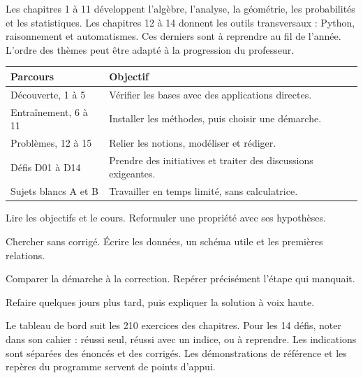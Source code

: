 \thispagestyle{otFront}
\fontsize{11}{15}\selectfont
{}
Les chapitres 1 à 11 développent l'algèbre, l'analyse, la géométrie, les probabilités
et les statistiques. Les chapitres 12 à 14 donnent les outils transversaux : Python,
raisonnement et automatismes. Ces derniers sont à reprendre au fil de l'année.
L'ordre des thèmes peut être adapté à la progression du professeur.\par\vspace{5mm}
\begin{tabularx}{\linewidth}{@{}p{38mm}Y@{}}\toprule
\textbf{Parcours} & \textbf{Objectif}\\\midrule
Découverte, 1 à 5 & Vérifier les bases avec des applications directes.\\[2mm]
Entraînement, 6 à 11 & Installer les méthodes, puis choisir une démarche.\\[2mm]
Problèmes, 12 à 15 & Relier les notions, modéliser et rédiger.\\[2mm]
Défis D01 à D14 & Prendre des initiatives et traiter des discussions exigeantes.\\[2mm]
Sujets blancs A et B & Travailler en temps limité, sans calculatrice.\\\bottomrule
\end{tabularx}
\vspace{6mm}
\begin{questions}
\item Lire les objectifs et le cours. Reformuler une propriété avec ses hypothèses.
\item Chercher sans corrigé. Écrire les données, un schéma utile et les premières relations.
\item Comparer la démarche à la correction. Repérer précisément l'étape qui manquait.
\item Refaire quelques jours plus tard, puis expliquer la solution à voix haute.
\end{questions}
\vspace{4mm}
Le tableau de bord suit les 210 exercices des chapitres. Pour les 14 défis,
noter dans son cahier : réussi seul, réussi avec un indice, ou à reprendre.
Les indications sont séparées des énoncés et des corrigés.
Les démonstrations de référence et les repères du programme servent de points d'appui.
\clearpage
